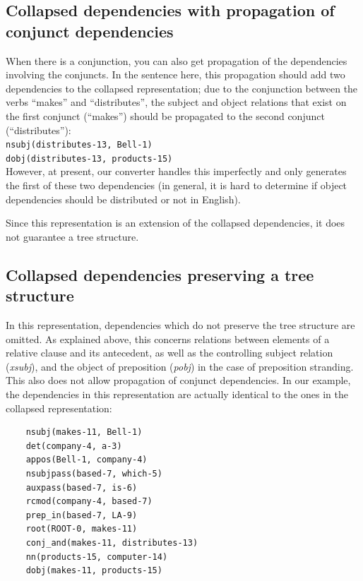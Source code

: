 \documentclass[11pt,letter]{article}
\begin{document}
\subsection{Collapsed dependencies with propagation of conjunct dependencies}
When there is a conjunction, you can also get propagation of the dependencies involving the conjuncts. In the sentence here, this propagation should add two dependencies to the collapsed representation; due to the conjunction between the verbs ``makes'' and ``distributes'', the subject and object relations that exist on the first conjunct (``makes'') should be propagated to the second conjunct (``distributes''):\\
\indent \texttt{nsubj(distributes-13, Bell-1)}\\
\indent \texttt{dobj(distributes-13, products-15)}\\
However, at present, our converter handles this imperfectly and only generates the first of these two dependencies (in general, it is hard to determine if object dependencies should be distributed or not in English).

Since this representation is an extension of the collapsed dependencies, it does not guarantee a tree structure.

\subsection{Collapsed dependencies preserving a tree structure}
In this representation, dependencies which do not preserve the tree structure are omitted. As explained above, this concerns relations between elements of a relative clause and its antecedent, as well as the controlling subject relation (\emph{xsubj}), and the object of preposition (\emph{pobj}) in the case of preposition stranding. This also does not allow propagation of conjunct dependencies. In our example, the dependencies in this representation are actually identical to the ones in the collapsed representation:
\begin{verbatim}
	nsubj(makes-11, Bell-1)
	det(company-4, a-3)
	appos(Bell-1, company-4)
	nsubjpass(based-7, which-5)
	auxpass(based-7, is-6)
	rcmod(company-4, based-7)
	prep_in(based-7, LA-9)
	root(ROOT-0, makes-11)
	conj_and(makes-11, distributes-13)
	nn(products-15, computer-14)
	dobj(makes-11, products-15)
\end{verbatim}
\end{document}
